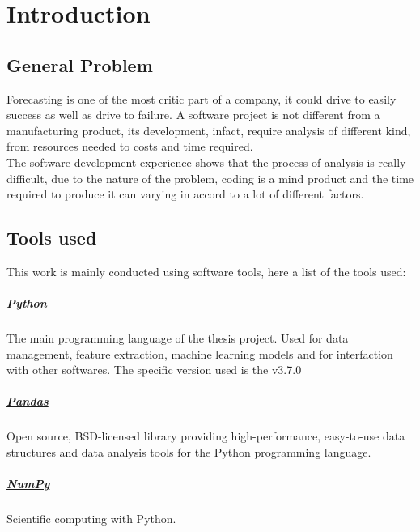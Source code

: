 \documentclass[%
    corpo=12pt,
    twoside,
    oldstyle,
    autoretitolo,
    greek,
    evenboxes,
]{toptesi}
\begin{document}

\chapter{Introduction}
\label{chap:intro}
\section{General Problem}
Forecasting is one of the most critic part of a company, it could drive to easily success as well as drive to failure. A software project is not different from a manufacturing product, its development, infact, require analysis of different kind, from resources needed to costs and time required.\\
The software development experience shows that the process of analysis is really difficult, due to the nature of the problem, coding is a mind product and the time required to produce it can varying in accord to a lot of different factors.

\section{Tools used}
This work is mainly conducted using software tools, here a list of the tools used:

\paragraph{\href{https://www.python.org/}{Python}} The main programming language of the thesis project. Used for data management, feature extraction, machine learning models and for interfaction with other softwares. The specific version used is the v3.7.0

\paragraph{\href{https://pandas.pydata.org/}{Pandas}} Open source, BSD-licensed library providing high-performance, easy-to-use data structures and data analysis tools for the Python programming language.

\paragraph{\href{https://numpy.org/}{NumPy}} Scientific computing with Python.
\end{document}
